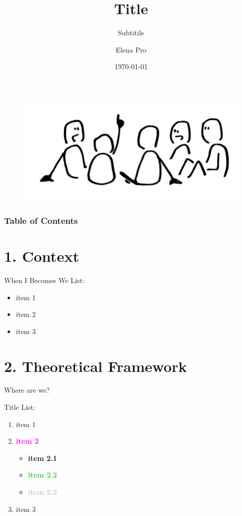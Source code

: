 \documentclass[xcolor=dvipsnames]{beamer}
\title{\LARGE Title}
\subtitle{Subtitile}
\author{Elena Pro}
\institute{\small European Institute \\ LSE}
\date{\small \printdayoff\today}
\newcommand{\textgb}[1]{\textcolor{OliveGreen}{\textbf{#1}}}
\newcommand{\textvb}[1]{\textcolor{Fuchsia}{\textbf{#1}}}
\newcommand{\textlb}[1]{\textcolor{LimeGreen}{\textbf{#1}}}
\newcommand{\texttb}[1]{\textcolor{Thistle}{\textbf{#1}}}
\begin{document}
\begin{frame}
\maketitle
\begin{figure}
    \centering
    \includegraphics[width=0.5\linewidth]{Screenshot 2024-03-19 at 15.57.46.png}  
\end{figure}

\end{frame}

\begin{frame}
\frametitle{Table of Contents}
\tableofcontents
\end{frame}

\section{1. Context}
\begin{frame}{\color{OliveGreen} When I Becomes We}
List:
\begin{itemize}
    \item item 1
    \pause
    \item item 2
    \pause
    \item item 3
\end{itemize}
\end{frame}

\section{ 2. Theoretical Framework}
\begin{frame}{Where are we?}
\end{frame}
\begin{frame}{Title}
List:
\begin{enumerate}
    \item item 1
    \item \textvb{item 2}
    \begin{itemize}
        \item \textgb{item 2.1}
        \item \textlb{item 2.2}
        \item \texttb{item 2.3}
    \end{itemize}
    \item item 3
\end{enumerate}
\end{frame}
\end{document}
